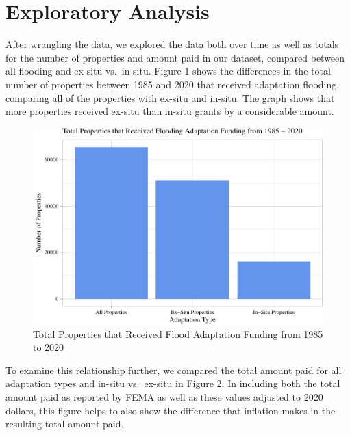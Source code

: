 \documentclass[
  12pt,
]{article}
\begin{document}
\newpage

\hypertarget{exploratory-analysis}{%
\section{Exploratory Analysis}\label{exploratory-analysis}}

After wrangling the data, we explored the data both over time as well as
totals for the number of properties and amount paid in our dataset,
compared between all flooding and ex-situ vs.~in-situ. Figure 1 shows
the differences in the total number of properties between 1985 and 2020
that received adaptation flooding, comparing all of the properties with
ex-situ and in-situ. The graph shows that more properties received
ex-situ than in-situ grants by a considerable amount.

\begin{figure}
\centering
\includegraphics{finalreport_files/figure-latex/unnamed-chunk-8-1.pdf}
\caption{Total Properties that Received Flood Adaptation Funding from
1985 to 2020}
\end{figure}

\newpage

To examine this relationship further, we compared the total amount paid
for all adaptation types and in-situ vs.~ex-situ in Figure 2. In
including both the total amount paid as reported by FEMA as well as
these values adjusted to 2020 dollars, this figure helps to also show
the difference that inflation makes in the resulting total amount paid.
\newline
\end{document}
